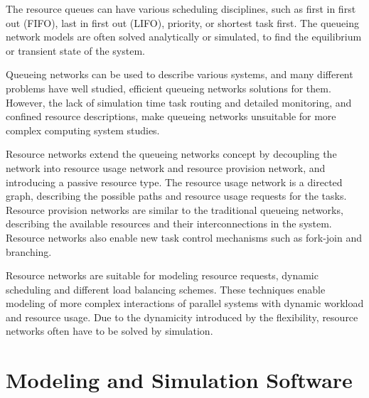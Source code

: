 The resource queues can have various scheduling disciplines, such as first in first out (FIFO), last in first out (LIFO), priority, or shortest task first. The queueing network models are often solved analytically or simulated, to find the equilibrium or transient state of the system.~\cite{Bolch:2006:Queueing}

Queueing networks can be used to describe various systems, and many different problems have well studied, efficient queueing networks solutions for them. However, the lack of simulation time task routing and detailed monitoring, and confined resource descriptions, make queueing networks unsuitable for more complex computing system studies.~\cite{Bolch:2006:Queueing}

Resource networks extend the queueing networks concept by decoupling the network into resource usage network and resource provision network, and introducing a passive resource type. The resource usage network is a directed graph, describing the possible paths and resource usage requests for the tasks. Resource provision networks are similar to the traditional queueing networks, describing the available resources and their interconnections in the system. Resource networks also enable new task control mechanisms such as fork-join and branching. ~\cite{Menasce:1994:CPP}

Resource networks are suitable for modeling resource requests, dynamic scheduling and different load balancing schemes. These techniques enable modeling of more complex interactions of parallel systems with dynamic workload and resource usage. Due to the dynamicity introduced by the flexibility, resource networks often have to be solved by simulation.~\cite{Menasce:1994:CPP}

\section{Modeling and Simulation Software}



